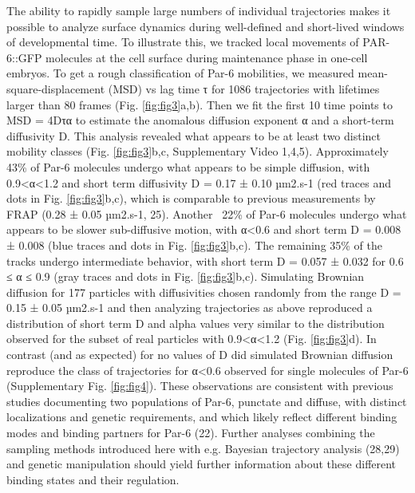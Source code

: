  The ability to rapidly sample large numbers of individual trajectories makes it possible to analyze surface dynamics during well-defined and short-lived windows of developmental time. To illustrate this, we tracked local movements of PAR-6::GFP molecules at the cell surface during maintenance phase in one-cell embryos. To get a rough classification of Par-6 mobilities, we measured mean-square-displacement (MSD) vs lag time τ for 1086 trajectories with lifetimes larger than 80 frames (Fig. \ref{fig:fig3}a,b). Then we fit the first 10 time points to MSD = 4Dτα to estimate the anomalous diffusion exponent α and a short-term diffusivity D. This analysis revealed what appears to be at least two distinct mobility classes (Fig. \ref{fig:fig3}b,c, Supplementary Video 1,4,5). Approximately 43\% of Par-6 molecules undergo what appears to be simple diffusion, with 0.9<α<1.2 and short term diffusivity D = 0.17 ± 0.10 µm2.s-1 (red traces and dots in Fig. \ref{fig:fig3}b,c), which is comparable to previous measurements by FRAP (0.28 ± 0.05 µm2.s-1, 25). Another ~22\% of Par-6 molecules undergo what appears to be slower sub-diffusive motion, with α<0.6 and short term D = 0.008 ± 0.008 (blue traces and dots in Fig. \ref{fig:fig3}b,c). The remaining 35\% of the tracks undergo intermediate behavior, with short term D = 0.057 ± 0.032 for 0.6 ≤ α ≤ 0.9 (gray traces and dots in Fig. \ref{fig:fig3}b,c). Simulating Brownian diffusion for 177 particles with diffusivities chosen randomly from the range D = 0.15 ± 0.05 µm2.s-1 and then analyzing trajectories as above reproduced a distribution of short term D and alpha values very similar to the distribution observed for the subset of real particles with 0.9<α<1.2 (Fig. \ref{fig:fig3}d). In contrast (and as expected) for no values of D did simulated Brownian diffusion reproduce the class of trajectories for α<0.6 observed for single molecules of Par-6 (Supplementary Fig. \ref{fig:fig4}). These observations are consistent with previous studies documenting two populations of Par-6, punctate and diffuse, with distinct localizations and genetic requirements, and which likely reflect different binding modes and binding partners for Par-6 (22). Further analyses combining the sampling methods introduced here with e.g. Bayesian trajectory analysis (28,29) and genetic manipulation should yield further information about these different binding states and their regulation.
 
